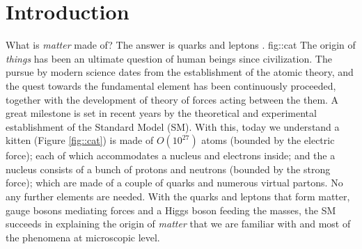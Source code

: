 \chapter{Introduction} \label{sec::preface}
{ 
What is \textit{matter} made of? 
The answer is quarks and leptons \cite{cat}.
}
{fig::cat}
The origin of \textit{things} has been an ultimate question of human beings since civilization.
The pursue by modern science dates from the establishment of the atomic theory, 
and the quest towards the fundamental element has been continuously proceeded,
together with the development of theory of forces acting between the them.
A great milestone is set in recent years by the theoretical and experimental establishment of the Standard Model (SM).
With this, today we understand a kitten (Figure \ref{fig::cat}) is made of $O(10^{27})$ atoms (bounded by the electric force);
each of which accommodates a nucleus and electrons inside;
and the a nucleus consists of a bunch of protons and neutrons (bounded by the strong force);
which are made of a couple of quarks and numerous virtual partons.
No any further elements are needed.
With the quarks and leptons that form matter, gauge bosons mediating forces and a Higgs boson feeding the masses,
the SM succeeds in explaining the origin of \textit{matter} that we are familiar with and most of the phenomena at microscopic level. \\
%
%
%
%

